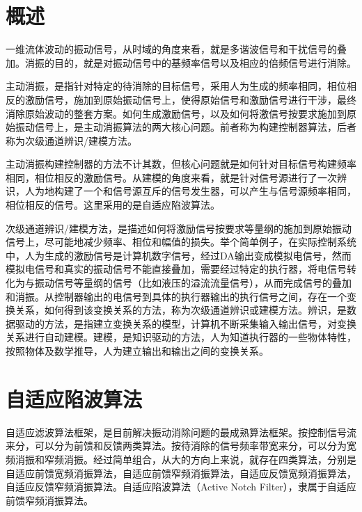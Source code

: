 \documentclass[12pt]{article}
\begin{document}
\tableofcontents
\thispagestyle{empty}
\newpage

\section{概述}
\label{sec:sec1}
一维流体波动的振动信号，从时域的角度来看，就是多谐波信号和干扰信号的叠加。消振的目的，就是对振动信号中的基频率信号以及相应的倍频信号进行消除。
\vspace{3mm}
\par
主动消振，是指针对特定的待消除的目标信号，采用人为生成的频率相同，相位相反的激励信号，施加到原始振动信号上，使得原始信号和激励信号进行干涉，最终消除原始波动的整套方案。如何生成激励信号，以及如何将激信号按要求施加到原始振动信号上，是主动消振算法的两大核心问题。前者称为构建控制器算法，后者称为次级通道辨识/建模方法。
\vspace{3mm}
\par
主动消振构建控制器的方法不计其数，但核心问题就是如何针对目标信号构建频率相同，相位相反的激励信号。从建模的角度来看，就是针对信号源进行了一次辨识，人为地构建了一个和信号源互斥的信号发生器，可以产生与信号源频率相同，相位相反的信号。这里采用的是自适应陷波算法。
\vspace{3mm}
\par
次级通道辨识/建模方法，是描述如何将激励信号按要求等量纲的施加到原始振动信号上，尽可能地减少频率、相位和幅值的损失。举个简单例子，在实际控制系统中，人为生成的激励信号是计算机数字信号，经过DA输出变成模拟电信号，然而模拟电信号和真实的振动信号不能直接叠加，需要经过特定的执行器，将电信号转化为与振动信号等量纲的信号（比如液压的溢流流量信号），从而完成信号的叠加和消振。从控制器输出的电信号到具体的执行器输出的执行信号之间，存在一个变换关系，如何得到该变换关系的方法，称为次级通道辨识或建模方法。辨识，是数据驱动的方法，是指建立变换关系的模型，计算机不断采集输入输出信号，对变换关系进行自动建模。建模，是知识驱动的方法，人为知道执行器的一些物体特性，按照物体及数学推导，人为建立输出和输出之间的变换关系。

\section{自适应陷波算法}
自适应滤波算法框架，是目前解决振动消除问题的最成熟算法框架。按控制信号流来分，可以分为前馈和反馈两类算法。按待消除的信号频率带宽来分，可以分为宽频消振和窄频消振。经过简单组合，从大的方向上来说，就存在四类算法，分别是自适应前馈宽频消振算法，自适应前馈窄频消振算法，自适应反馈宽频消振算法，自适应反馈窄频消振算法。自适应陷波算法（Active Notch Filter），隶属于自适应前馈窄频消振算法。
\end{document}
